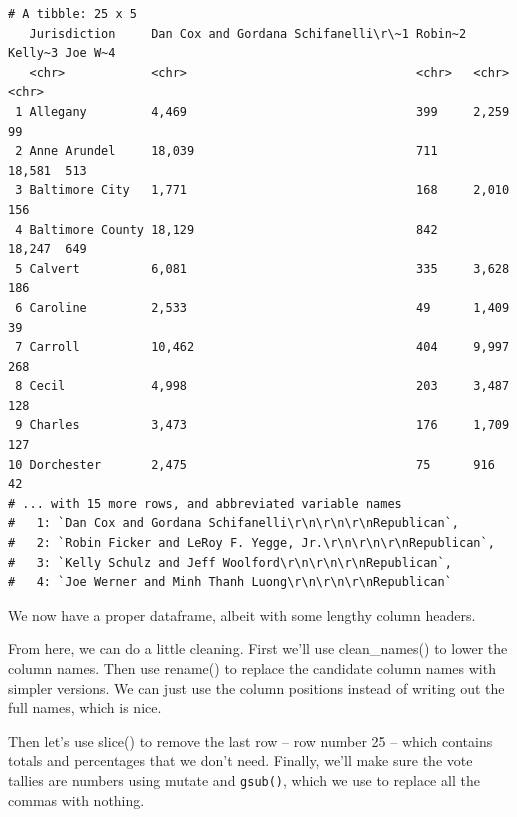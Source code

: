 \documentclass[
  letterpaper,
  DIV=11,
  numbers=noendperiod]{scrreprt}
\begin{document}
\begin{verbatim}
# A tibble: 25 x 5
   Jurisdiction     Dan Cox and Gordana Schifanelli\r\~1 Robin~2 Kelly~3 Joe W~4
   <chr>            <chr>                                <chr>   <chr>   <chr>  
 1 Allegany         4,469                                399     2,259   99     
 2 Anne Arundel     18,039                               711     18,581  513    
 3 Baltimore City   1,771                                168     2,010   156    
 4 Baltimore County 18,129                               842     18,247  649    
 5 Calvert          6,081                                335     3,628   186    
 6 Caroline         2,533                                49      1,409   39     
 7 Carroll          10,462                               404     9,997   268    
 8 Cecil            4,998                                203     3,487   128    
 9 Charles          3,473                                176     1,709   127    
10 Dorchester       2,475                                75      916     42     
# ... with 15 more rows, and abbreviated variable names
#   1: `Dan Cox and Gordana Schifanelli\r\n\r\n\r\nRepublican`,
#   2: `Robin Ficker and LeRoy F. Yegge, Jr.\r\n\r\n\r\nRepublican`,
#   3: `Kelly Schulz and Jeff Woolford\r\n\r\n\r\nRepublican`,
#   4: `Joe Werner and Minh Thanh Luong\r\n\r\n\r\nRepublican`
\end{verbatim}

We now have a proper dataframe, albeit with some lengthy column headers.

From here, we can do a little cleaning. First we'll use clean\_names()
to lower the column names. Then use rename() to replace the candidate
column names with simpler versions. We can just use the column positions
instead of writing out the full names, which is nice.

Then let's use slice() to remove the last row -- row number 25 -- which
contains totals and percentages that we don't need. Finally, we'll make
sure the vote tallies are numbers using mutate and \texttt{gsub()},
which we use to replace all the commas with nothing.
\end{document}
